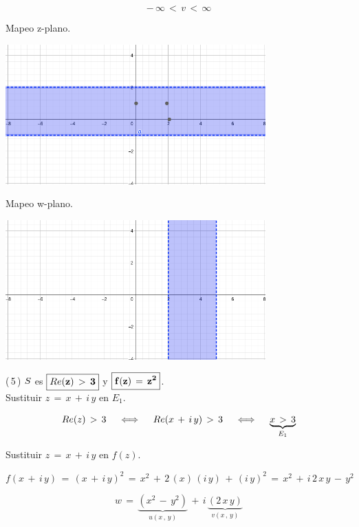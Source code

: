 \documentclass[a4paper,11pt,openany]{book}
\begin{document}
$$-\,\infty\,<\,v\,<\,\infty$$

\textcolor{ao(english)}{} Mapeo z-plano.

\begin{center}
     \includegraphics[width=10cm]{Mapeo-Ej-4-z}
\end{center}

\textcolor{ao(english)}{} Mapeo w-plano.

\begin{center}
     \includegraphics[width=10cm]{Mapeo-Ej-4-w}
\end{center}

\textcolor{ao(english)}{(\,5\,)} $\mathnormal{S}$ es $\boxed{\bf{\mathnormal{Re}(z)\,>\,3}}$ y $\boxed{\bf{f(z)\,=\,z^{2}}}$.\\

\textcolor{ao(english)}{} Sustituir $z\,=\,x\,+\,i\,y$ en $E_{1}$.

$$\mathnormal{Re}(z)\,>\,3 \quad\iff\quad \mathnormal{Re}(x\,+\,i\,y)\,>\,3 \quad\iff\quad \underbrace{x\,>\,3}_{E_{1}}$$

\textcolor{ao(english)}{} Sustituir $z\,=\,x\,+\,i\,y$ en $f(z)$.

$$f(x\,+\,i\,y)\,=\,(x\,+\,i\,y)^{2}\,=\,x^{2}\,+\,2\,(x)\,(i\,y)\,+\,(i\,y)^{2}\,=\,x^{2}\,+\,i\,2\,x\,y\,-\,y^{2}$$

$$w\,=\,\underbrace{(x^{2}\,-\,y^{2})}_{u(x\,,\,y)}\,+\,i\,\underbrace{(2\,x\,y)}_{v(x\,,\,y)}$$
\end{document}

